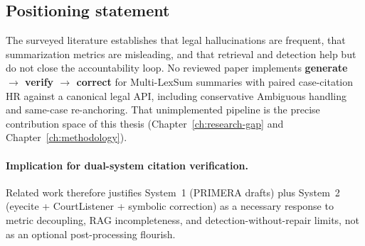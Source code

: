 \subsection{Positioning statement}

The surveyed literature establishes that legal hallucinations are frequent, that summarization metrics are misleading, and that retrieval and detection help but do not close the accountability loop. No reviewed paper implements \textbf{generate $\rightarrow$ verify $\rightarrow$ correct} for Multi-LexSum summaries with paired case-citation HR against a canonical legal API, including conservative Ambiguous handling and same-case re-anchoring. That unimplemented pipeline is the precise contribution space of this thesis (Chapter~\ref{ch:research-gap} and Chapter~\ref{ch:methodology}).

\paragraph{Implication for dual-system citation verification.}
Related work therefore justifies System~1 (PRIMERA drafts) plus System~2 (eyecite + CourtListener + symbolic correction) as a necessary response to metric decoupling, RAG incompleteness, and detection-without-repair limits, not as an optional post-processing flourish.
